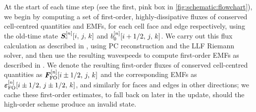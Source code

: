 At the start of each time step (see the first, pink box in \cref{fig:schematic:flowchart}), we begin by computing a set of first-order, highly-dissipative fluxes of conserved cell-centred quantities and EMFs, for each cell face and edge respectively, using the old-time state $\bm{S}_\mathrm{c}^{[n]}\!\left[ i,\,j,\,k \right]$ and $b_0^{[n]}\!\left[ i + 1/2,\,j,\,k \right]$. We carry out this flux calculation as described in , using PC reconstruction and the LLF Riemann solver, and then use the resulting wavespeeds to compute first-order EMFs as described in . We denote the resulting first-order fluxes of conserved cell-centred quantities as $\bm{F}_\mathrm{FO}^{[n]}\!\left[ i \pm 1/2,\,j,\,k \right]$ and the corresponding EMFs as $\bm{\varepsilon}_\mathrm{FO}^{[n]}\!\left[ i \pm 1/2,\,j \pm 1/2,\,k \right]$, and similarly for faces and edges in other directions; we cache these first-order estimates, to fall back on later in the update, should the high-order scheme produce an invalid state.

